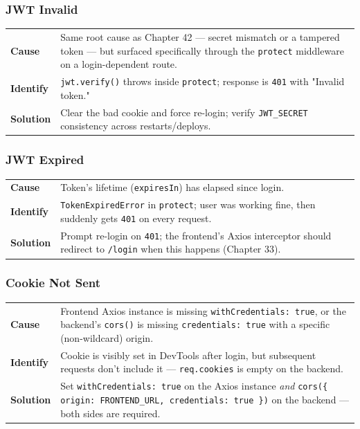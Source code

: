 \subsubsection*{JWT Invalid}
\noindent\begin{tabularx}{\textwidth}{@{}>{\bfseries}p{2.3cm}X@{}}
\toprule
Cause & Same root cause as Chapter 42 --- secret mismatch or a tampered
token --- but surfaced specifically through the \texttt{protect}
middleware on a login-dependent route. \\
Identify & \texttt{jwt.verify()} throws inside \texttt{protect}; response
is \texttt{401} with "Invalid token." \\
Solution & Clear the bad cookie and force re-login; verify
\texttt{JWT\_SECRET} consistency across restarts/deploys. \\
\bottomrule
\end{tabularx}

\subsubsection*{JWT Expired}
\noindent\begin{tabularx}{\textwidth}{@{}>{\bfseries}p{2.3cm}X@{}}
\toprule
Cause & Token's lifetime (\texttt{expiresIn}) has elapsed since login. \\
Identify & \texttt{TokenExpiredError} in \texttt{protect}; user was
working fine, then suddenly gets \texttt{401} on every request. \\
Solution & Prompt re-login on \texttt{401}; the frontend's Axios
interceptor should redirect to \texttt{/login} when this happens
(Chapter 33). \\
\bottomrule
\end{tabularx}

\subsubsection*{Cookie Not Sent}
\noindent\begin{tabularx}{\textwidth}{@{}>{\bfseries}p{2.3cm}X@{}}
\toprule
Cause & Frontend Axios instance is missing \texttt{withCredentials: true},
or the backend's \texttt{cors()} is missing \texttt{credentials: true}
with a specific (non-wildcard) origin. \\
Identify & Cookie is visibly set in DevTools after login, but subsequent
requests don't include it --- \texttt{req.cookies} is empty on the
backend. \\
Solution & Set \texttt{withCredentials: true} on the Axios instance
\emph{and} \texttt{cors(\{ origin: FRONTEND\_URL, credentials: true \})}
on the backend --- both sides are required. \\
\bottomrule
\end{tabularx}

